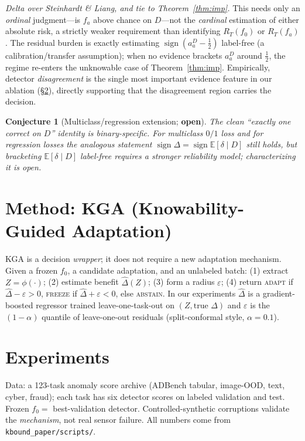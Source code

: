 \documentclass[11pt]{article}
\theoremstyle{plain}
\newtheorem{conjecture}{Conjecture}
\theoremstyle{definition}
\newcommand{\E}{\mathbb{E}}
\newcommand{\sign}{\operatorname{sign}}
\begin{document}
\noindent\emph{Delta over Steinhardt \& Liang, and tie to Theorem~\ref{thm:imp}.}
This needs only an \emph{ordinal} judgment---is $f_a$ above chance on $D$---not the
\emph{cardinal} estimation of either absolute risk, a strictly weaker requirement than
identifying $R_T(f_0)$ or $R_T(f_a)$. The residual burden is exactly estimating
$\sign(a_a^D-\tfrac12)$ label-free (a calibration/transfer assumption); when no
evidence brackets $a_a^D$ around $\tfrac12$, the regime re-enters the unknowable case
of Theorem~\ref{thm:imp}. Empirically, detector \emph{disagreement} is the single most
important evidence feature in our ablation (\S\ref{sec:exp}), directly supporting that
the disagreement region carries the decision.
\begin{conjecture}[Multiclass/regression extension; \textbf{open}]\label{conj:gen}
The clean ``exactly one correct on $D$'' identity is binary-specific. For multiclass
$0/1$ loss and for regression losses the analogous statement
$\sign\Delta=\sign\E[\delta\mid D]$ still holds, but bracketing $\E[\delta\mid D]$ label-free
requires a stronger reliability model; characterizing it is open.
\end{conjecture}

\section{Method: \textsc{KGA} (Knowability-Guided Adaptation)}
\textsc{KGA} is a decision \emph{wrapper}; it does not require a new adaptation
mechanism. Given a frozen $f_0$, a candidate adaptation, and an unlabeled batch:
(1) extract $Z=\phi(\cdot)$; (2) estimate benefit $\widehat\Delta(Z)$; (3) form a
radius $\varepsilon$; (4) return \textsc{adapt} if $\widehat\Delta-\varepsilon>0$,
\textsc{freeze} if $\widehat\Delta+\varepsilon<0$, else \textsc{abstain}. In our
experiments $\widehat\Delta$ is a gradient-boosted regressor trained leave-one-task-out
on $(Z,\text{true }\Delta)$ and $\varepsilon$ is the $(1-\alpha)$ quantile of
leave-one-out residuals (split-conformal style, $\alpha=0.1$).

\section{Experiments}\label{sec:exp}
Data: a 123-task anomaly score archive (ADBench tabular, image-OOD, text, cyber,
fraud); each task has six detector scores on labeled validation and test. Frozen
$f_0=$ best-validation detector. Controlled-synthetic corruptions validate the
\emph{mechanism}, not real sensor failure. All numbers come from
\texttt{kbound\_paper/scripts/}.
\end{document}
